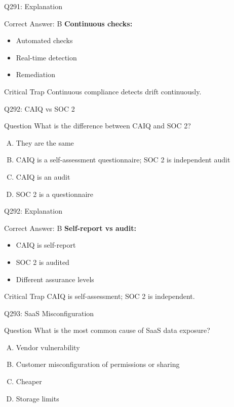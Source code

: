\documentclass{beamer}
\begin{document}
	\begin{frame}{Q291: Explanation}
		\begin{block}{Correct Answer: B}
			\textbf{Continuous checks:}
			\begin{itemize}
				\item Automated checks
				\item Real-time detection
				\item Remediation
			\end{itemize}
		\end{block}
		\begin{alertblock}{Critical Trap}
			Continuous compliance detects drift continuously.
		\end{alertblock}
	\end{frame}
	
	\begin{frame}{Q292: CAIQ vs SOC 2}
		\begin{block}{Question}
			What is the difference between CAIQ and SOC 2?
		\end{block}
		\begin{enumerate}[(A)]
			\item They are the same
			\item CAIQ is a self-assessment questionnaire; SOC 2 is independent audit
			\item CAIQ is an audit
			\item SOC 2 is a questionnaire
		\end{enumerate}
	\end{frame}
	
	\begin{frame}{Q292: Explanation}
		\begin{block}{Correct Answer: B}
			\textbf{Self-report vs audit:}
			\begin{itemize}
				\item CAIQ is self-report
				\item SOC 2 is audited
				\item Different assurance levels
			\end{itemize}
		\end{block}
		\begin{alertblock}{Critical Trap}
			CAIQ is self-assessment; SOC 2 is independent.
		\end{alertblock}
	\end{frame}
	
	\begin{frame}{Q293: SaaS Misconfiguration}
		\begin{block}{Question}
			What is the most common cause of SaaS data exposure?
		\end{block}
		\begin{enumerate}[(A)]
			\item Vendor vulnerability
			\item Customer misconfiguration of permissions or sharing
			\item Cheaper
			\item Storage limits
		\end{enumerate}
	\end{frame}
	
\end{document}

